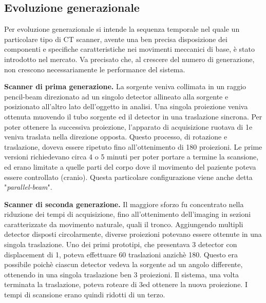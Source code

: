 \documentclass[a4paper,12pt, doubleside]{report}
\begin{document}
            \subsection{Evoluzione generazionale}
                \par
                    Per evoluzione generazionale si intende la sequenza temporale nel quale un particolare tipo di CT scanner, avente una ben precisa disposizione dei componenti e specifiche caratteristiche nei movimenti meccanici di base, è stato introdotto nel mercato. Va precisato che, al crescere del numero di generazione, non crescono necessariamente le performance del sistema.
                        
                \bigskip
                \par
                    \textbf{Scanner di prima generazione.} La sorgente veniva collimata in un raggio pencil-beam direzionato ad un singolo detector allineato alla sorgente e posizionato all’altro lato dell'oggetto in analisi. Una singola proiezione veniva ottenuta muovendo il tubo sorgente ed il detector in una traslazione sincrona. Per poter ottenere la successiva proiezione, l'apparato di acquisizione ruotava di 1\degree e veniva traslata nella direzione opposta. Questo processo, di rotazione e traslazione, doveva essere ripetuto fino all’ottenimento di 180 proiezioni. Le prime versioni richiedevano circa 4 o 5 minuti per poter portare a termine la scansione, ed erano limitate a quelle parti del corpo dove il movimento del paziente poteva essere controllato (cranio). Questa particolare configurazione viene anche detta "\textit{parallel-beam}".
                            
                \bigskip
                \par
                    \textbf{Scanner di seconda generazione.} Il maggiore sforzo fu concentrato nella riduzione dei tempi di acquisizione, fino all'ottenimento dell'imaging in sezioni caratterizzate da movimento naturale, quali il tronco. Aggiungendo multipli detector disposti circolarmente, diverse proiezioni potevano essere ottenute in una singola traslazione. Uno dei primi prototipi, che presentava 3 detector con displacement di 1\degree, poteva effettuare 60 traslazioni anzichè 180. Questo era possibile poichè ciascun detector vedeva la sorgente ad un angolo differente, ottenendo in una singola traslazione ben 3 proiezioni. Il sistema, una volta terminata la traslazione, poteva roteare di 3\degree  ed ottenere la nuova proiezione. I tempi di scansione erano quindi ridotti di un terzo. 
                        
\end{document}
